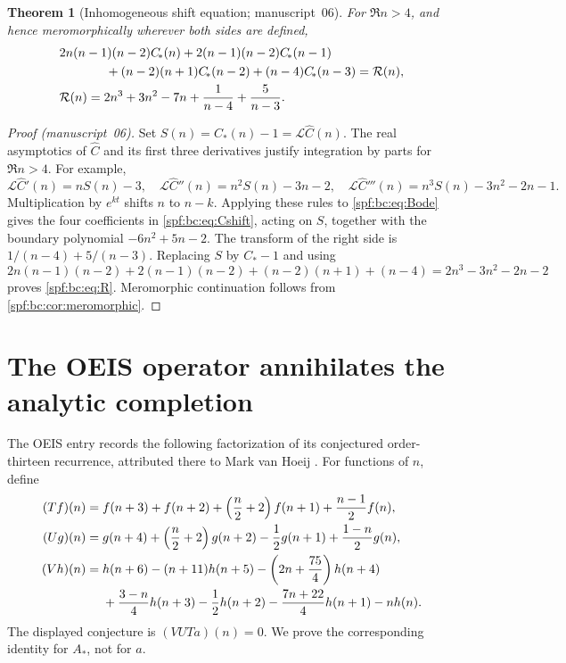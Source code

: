 \documentclass[11pt]{article}
\numberwithin{equation}{section}
\newtheorem{theorem}{Theorem}[section]
\theoremstyle{definition}
\theoremstyle{remark}
\theoremstyle{definition}
\newcommand{\bcC}{C_{\!*}}
\newcommand{\bcA}{A_{\!*}}
\begin{document}
\begin{theorem}[Inhomogeneous shift equation; manuscript~06]
\label{spf:bc:thm:shift}
For $\Re n>4$, and hence meromorphically wherever both sides are defined,
\begin{align}
 &2n(n-1)(n-2)\bcC(n)+2(n-1)(n-2)\bcC(n-1)\notag\\
 &\hspace{13mm}+(n-2)(n+1)\bcC(n-2)+(n-4)\bcC(n-3)=\mathcal R(n),
 \label{spf:bc:eq:Cshift}\\
 &\mathcal R(n)=2n^3+3n^2-7n+\frac1{n-4}+\frac5{n-3}.
 \label{spf:bc:eq:R}
\end{align}
\end{theorem}
\begin{proof}[Proof (manuscript~06)]
Set $S(n)=\bcC(n)-1=\mathscr L\widehat C(n)$. The real asymptotics of $\widehat C$ and its
first three derivatives justify integration by parts for $\Re n>4$.
For example,
\[
 \mathscr L\widehat C'(n)=nS(n)-3,\quad
 \mathscr L\widehat C''(n)=n^2S(n)-3n-2,\quad
 \mathscr L\widehat C'''(n)=n^3S(n)-3n^2-2n-1.
\]
Multiplication by $e^{kt}$ shifts $n$ to $n-k$. Applying these rules to
\eqref{spf:bc:eq:Bode} gives the four coefficients in \eqref{spf:bc:eq:Cshift}, acting
on $S$, together with the boundary polynomial $-6n^2+5n-2$. The transform
of the right side is $1/(n-4)+5/(n-3)$. Replacing $S$ by $\bcC-1$ and using
\[
 2n(n-1)(n-2)+2(n-1)(n-2)+(n-2)(n+1)+(n-4)
 =2n^3-3n^2-2n-2
\]
proves \eqref{spf:bc:eq:R}. Meromorphic continuation follows from
\cref{spf:bc:cor:meromorphic}.
\end{proof}

\section{The OEIS operator annihilates the analytic completion}
\label{spf:bc:sec:operator}

The OEIS entry records the following factorization of its conjectured
order-thirteen recurrence, attributed there to Mark van Hoeij \cite{bcOeis}.
For functions of $n$, define
\begin{align}
 (Tf)(n)={}&f(n+3)+f(n+2)+\left(\frac n2+2\right)f(n+1)
                           +\frac{n-1}{2}f(n),\label{spf:bc:eq:T}\\
 (Ug)(n)={}&g(n+4)+\left(\frac n2+2\right)g(n+2)
                          -\frac12g(n+1)+\frac{1-n}{2}g(n),\label{spf:bc:eq:U}\\
 (Vh)(n)={}&h(n+6)-(n+11)h(n+5)
                  -\left(2n+\frac{75}{4}\right)h(n+4)\notag\\
          &+\frac{3-n}{4}h(n+3)-\frac12h(n+2)
                         -\frac{7n+22}{4}h(n+1)-nh(n).
 \label{spf:bc:eq:V}
\end{align}
The displayed conjecture is $(VUTa)(n)=0$. We prove the corresponding
identity for $\bcA$, not for $a$.
\end{document}
